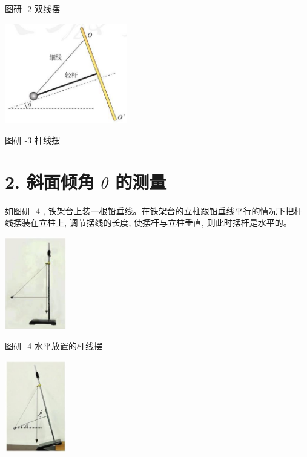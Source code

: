 \documentclass[10pt]{article}
\begin{document}
图研 -2 双线摆

\begin{center}
\includegraphics[max width=0.4\textwidth]{images/01910e4c-ebb8-7d2c-8f2f-2375bc1d2d12_122_311971.jpg}
\end{center}

图研 -3 杆线摆

\section*{2. 斜面倾角 \(\theta\) 的测量}

如图研 -4 , 铁架台上装一根铅垂线。在铁架台的立柱跟铅垂线平行的情况下把杆线摆装在立柱上, 调节摆线的长度, 使摆杆与立柱垂直, 则此时摆杆是水平的。

\begin{center}
\includegraphics[max width=0.2\textwidth]{images/01910e4c-ebb8-7d2c-8f2f-2375bc1d2d12_123_773431.jpg}
\end{center}

图研 -4 水平放置的杆线摆

\begin{center}
\includegraphics[max width=0.2\textwidth]{images/01910e4c-ebb8-7d2c-8f2f-2375bc1d2d12_123_826923.jpg}
\end{center}
\end{document}
